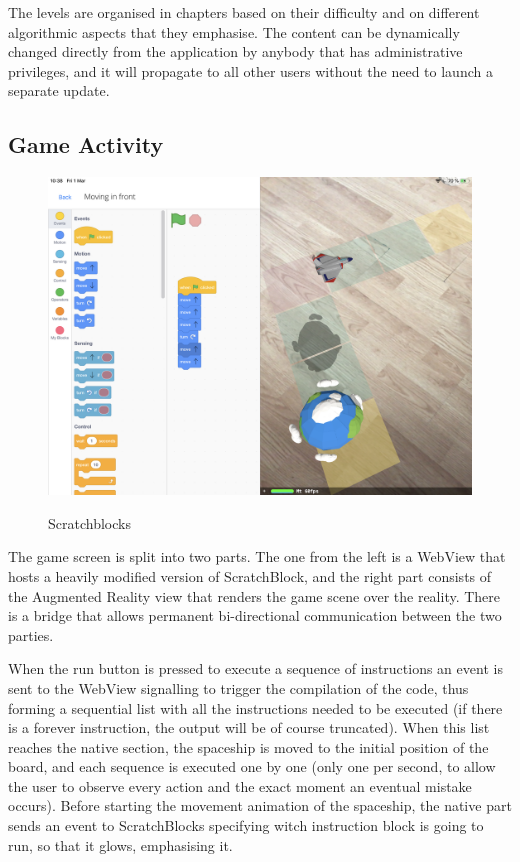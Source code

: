 \documentclass[12 pct]{report}
\begin{document}
The levels are organised in chapters based on their difficulty and on different algorithmic aspects that they emphasise. The content can be dynamically changed directly from the application by anybody that has administrative privileges, and it will propagate to all other users without the need to launch a separate update.


\subsection*{Game Activity}
\begin{figure}[H]
\includegraphics[width=1.0\textwidth]{ArRobotCode2}
\centering
\label{fig:hololens}
\caption{Scratchblocks}
\end{figure}
The game screen is split into two parts. The one from the left is a WebView that hosts a heavily modified version of ScratchBlock, and the right part consists of the Augmented Reality view that renders the game scene over the reality. There is a bridge that allows permanent bi-directional communication between the two parties.

When the run button is pressed to execute a sequence of instructions an event is sent to the WebView signalling to trigger the compilation of the code, thus forming a sequential list with all the instructions needed to be executed (if there is a forever instruction, the output will be of course truncated). When this list reaches the native section, the spaceship is moved to the initial position of the board, and each sequence is executed one by one (only one per second, to allow the user to observe every action and the exact moment an eventual mistake occurs). Before starting the movement animation of the spaceship, the native part sends an event to ScratchBlocks specifying witch instruction block is going to run, so that it glows, emphasising it.
\end{document}
